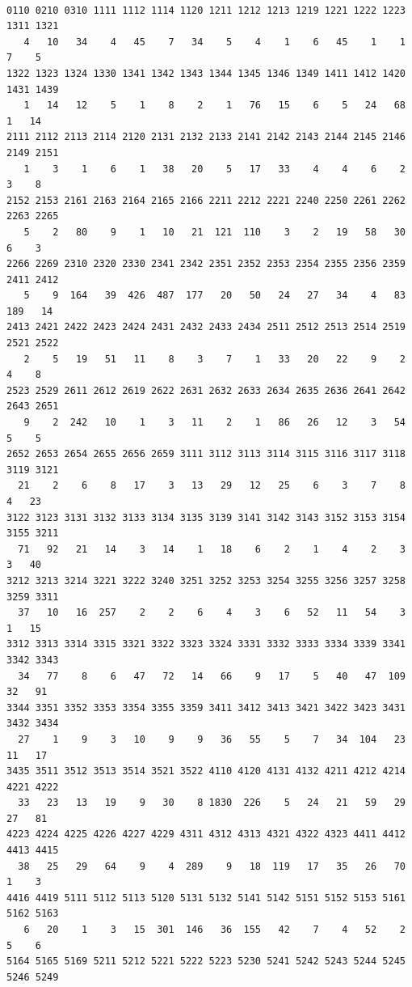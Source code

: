 \documentclass[
]{article}
\begin{document}
\begin{verbatim}

0110 0210 0310 1111 1112 1114 1120 1211 1212 1213 1219 1221 1222 1223 1311 1321 
   4   10   34    4   45    7   34    5    4    1    6   45    1    1    7    5 
1322 1323 1324 1330 1341 1342 1343 1344 1345 1346 1349 1411 1412 1420 1431 1439 
   1   14   12    5    1    8    2    1   76   15    6    5   24   68    1   14 
2111 2112 2113 2114 2120 2131 2132 2133 2141 2142 2143 2144 2145 2146 2149 2151 
   1    3    1    6    1   38   20    5   17   33    4    4    6    2    3    8 
2152 2153 2161 2163 2164 2165 2166 2211 2212 2221 2240 2250 2261 2262 2263 2265 
   5    2   80    9    1   10   21  121  110    3    2   19   58   30    6    3 
2266 2269 2310 2320 2330 2341 2342 2351 2352 2353 2354 2355 2356 2359 2411 2412 
   5    9  164   39  426  487  177   20   50   24   27   34    4   83  189   14 
2413 2421 2422 2423 2424 2431 2432 2433 2434 2511 2512 2513 2514 2519 2521 2522 
   2    5   19   51   11    8    3    7    1   33   20   22    9    2    4    8 
2523 2529 2611 2612 2619 2622 2631 2632 2633 2634 2635 2636 2641 2642 2643 2651 
   9    2  242   10    1    3   11    2    1   86   26   12    3   54    5    5 
2652 2653 2654 2655 2656 2659 3111 3112 3113 3114 3115 3116 3117 3118 3119 3121 
  21    2    6    8   17    3   13   29   12   25    6    3    7    8    4   23 
3122 3123 3131 3132 3133 3134 3135 3139 3141 3142 3143 3152 3153 3154 3155 3211 
  71   92   21   14    3   14    1   18    6    2    1    4    2    3    3   40 
3212 3213 3214 3221 3222 3240 3251 3252 3253 3254 3255 3256 3257 3258 3259 3311 
  37   10   16  257    2    2    6    4    3    6   52   11   54    3    1   15 
3312 3313 3314 3315 3321 3322 3323 3324 3331 3332 3333 3334 3339 3341 3342 3343 
  34   77    8    6   47   72   14   66    9   17    5   40   47  109   32   91 
3344 3351 3352 3353 3354 3355 3359 3411 3412 3413 3421 3422 3423 3431 3432 3434 
  27    1    9    3   10    9    9   36   55    5    7   34  104   23   11   17 
3435 3511 3512 3513 3514 3521 3522 4110 4120 4131 4132 4211 4212 4214 4221 4222 
  33   23   13   19    9   30    8 1830  226    5   24   21   59   29   27   81 
4223 4224 4225 4226 4227 4229 4311 4312 4313 4321 4322 4323 4411 4412 4413 4415 
  38   25   29   64    9    4  289    9   18  119   17   35   26   70    1    3 
4416 4419 5111 5112 5113 5120 5131 5132 5141 5142 5151 5152 5153 5161 5162 5163 
   6   20    1    3   15  301  146   36  155   42    7    4   52    2    5    6 
5164 5165 5169 5211 5212 5221 5222 5223 5230 5241 5242 5243 5244 5245 5246 5249 

\end{verbatim}
\end{document}
